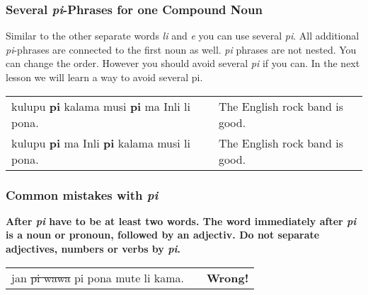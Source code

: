 \subsubsection*{Several \textit{pi}-Phrases for one Compound Noun} 

Similar to the other separate words \textit{li} and \textit{e} you can use several \textit{pi}. 
All additional \textit{pi}-phrases are connected to the first noun as well. 
\textit{pi} phrases are not nested. 
You can change the order. 
However you should avoid several \textit{pi} if you can. 
In the next lesson we will learn a way to avoid several pi.

\begin{supertabular}{p{5,5cm}|ll}
kulupu \textbf{pi} kalama musi \textbf{pi} ma Inli li pona. &&  The English rock band is good. \\ 
kulupu \textbf{pi} ma Inli \textbf{pi} kalama musi li pona. &&  The English rock band is good. \\ 
\end{supertabular}

% 
\label{'mistakes_with_pi'}
\subsubsection*{Common mistakes with \textit{pi}}
%
\textbf{After \textit{pi} have to be at least two words. 
The word immediately after \textit{pi} is a noun or pronoun, followed by an adjectiv.
Do not separate adjectives, numbers or verbs by \textit{pi}.}

\begin{supertabular}{p{5,5cm}|ll}
jan \sout{pi wawa} pi pona mute li kama. && \textbf{Wrong!} \\ %
\end{supertabular}

